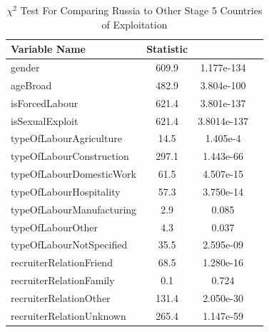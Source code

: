 \documentclass{article} %
\begin{document}
\begin{table}[!ht]
	\centering
	\caption{$\chi^2$ Test For Comparing Russia to Other Stage 5 Countries of Exploitation}
	\begin{tabular}{lccc}
		\toprule
		\bf{Variable Name}        & \boldmath{$\chi^2$} \bf{Statistic} & \boldmath{$p$} & \boldmath{$p<0.05$} \\ \midrule
		gender                    &               609.9                &   1.177e-134   &   \boldmath{$*$}    \\
		ageBroad                  &               482.9                &   3.804e-100   &   \boldmath{$*$}    \\
		isForcedLabour            &               621.4                &   3.801e-137   &   \boldmath{$*$}    \\
		isSexualExploit           &               621.4                &  3.8014e-137   &   \boldmath{$*$}    \\
		typeOfLabourAgriculture   &                14.5                &    1.405e-4    &   \boldmath{$*$}    \\
		typeOfLabourConstruction  &               297.1                &   1.443e-66    &   \boldmath{$*$}    \\
		typeOfLabourDomesticWork  &                61.5                &   4.507e-15    &   \boldmath{$*$}    \\
		typeOfLabourHospitality   &                57.3                &   3.750e-14    &   \boldmath{$*$}    \\
		typeOfLabourManufacturing &                2.9                 &     0.085      &                     \\
		typeOfLabourOther         &                4.3                 &     0.037      &   \boldmath{$*$}    \\
		typeOfLabourNotSpecified  &                35.5                &   2.595e-09    &   \boldmath{$*$}    \\
		recruiterRelationFriend   &                68.5                &   1.280e-16    &   \boldmath{$*$}    \\
		recruiterRelationFamily   &                0.1                 &     0.724      &                     \\
		recruiterRelationOther    &               131.4                &   2.050e-30    &   \boldmath{$*$}    \\
		recruiterRelationUnknown  &               265.4                &   1.147e-59    &   \boldmath{$*$}    \\ \bottomrule
	\end{tabular}
\end{table}
\end{document}
